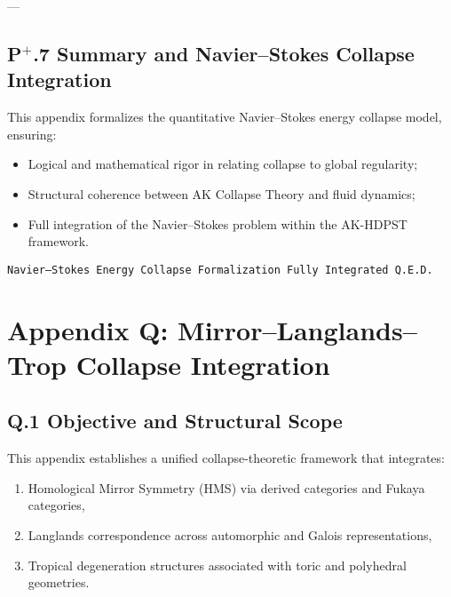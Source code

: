 \documentclass[11pt]{article}
\begin{document}
---

\subsection*{P$^{+}$.7 Summary and Navier–Stokes Collapse Integration}

This appendix formalizes the quantitative Navier–Stokes energy collapse model, ensuring:

\begin{itemize}
    \item Logical and mathematical rigor in relating collapse to global regularity;
    \item Structural coherence between AK Collapse Theory and fluid dynamics;
    \item Full integration of the Navier–Stokes problem within the AK-HDPST framework.
\end{itemize}

\begin{flushright}
\texttt{Navier–Stokes Energy Collapse Formalization \quad Fully Integrated \quad Q.E.D.}
\end{flushright}




\section*{Appendix Q: Mirror–Langlands–Trop Collapse Integration}

\subsection*{Q.1 Objective and Structural Scope}

This appendix establishes a unified collapse-theoretic framework that integrates:

\begin{enumerate}
  \item Homological Mirror Symmetry (HMS) via derived categories and Fukaya categories,
  \item Langlands correspondence across automorphic and Galois representations,
  \item Tropical degeneration structures associated with toric and polyhedral geometries.
\end{enumerate}
\end{document}
